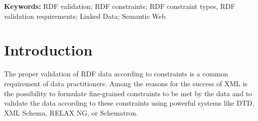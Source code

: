 \documentclass[a4paper,fontsize=11pt]{scrartcl}
\begin{document}

\hspace{-1.4em}
\textbf{Keywords:}
RDF validation; RDF constraints; RDF constraint types, RDF validation requirements; Linked Data; Semantic Web

\section{Introduction}

The proper validation of RDF data according to constraints is a common requirement of data practitioners. 
Among the reasons for the success of XML is the possibility to formulate fine-grained constraints to be met by the data and to validate the data according to these constraints using powerful systems like DTD, XML Schema, RELAX NG, or Schematron.
\end{document}
